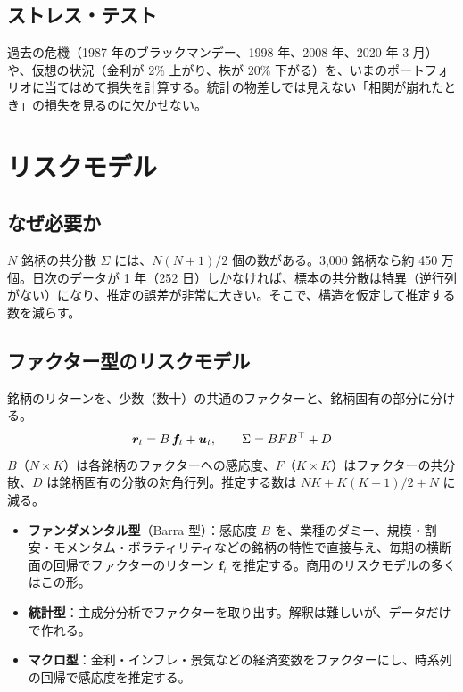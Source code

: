 \subsection{ストレス・テスト}

過去の危機（1987 年のブラックマンデー、1998 年、2008 年、2020 年 3 月）や、仮想の状況（金利が 2\% 上がり、株が 20\% 下がる）を、いまのポートフォリオに当てはめて損失を計算する。統計の物差しでは見えない「相関が崩れたとき」の損失を見るのに欠かせない。

\section{リスクモデル}

\subsection{なぜ必要か}

$N$ 銘柄の共分散 $\Sigma$ には、$N(N+1)/2$ 個の数がある。3,000 銘柄なら約 450 万個。日次のデータが 1 年（252 日）しかなければ、標本の共分散は特異（逆行列がない）になり、推定の誤差が非常に大きい。そこで、構造を仮定して推定する数を減らす。

\subsection{ファクター型のリスクモデル}

銘柄のリターンを、少数（数十）の共通のファクターと、銘柄固有の部分に分ける。
\begin{equation}
\bm r_t = B\,\bm f_t + \bm u_t, \qquad \Sigma = B F B^{\top} + D
\end{equation}
$B$（$N \times K$）は各銘柄のファクターへの感応度、$F$（$K \times K$）はファクターの共分散、$D$ は銘柄固有の分散の対角行列。推定する数は $NK + K(K+1)/2 + N$ に減る。

\begin{itemize}
\item \textbf{ファンダメンタル型}（Barra 型）：感応度 $B$ を、業種のダミー、規模・割安・モメンタム・ボラティリティなどの銘柄の特性で直接与え、毎期の横断面の回帰でファクターのリターン $\bm f_t$ を推定する。商用のリスクモデルの多くはこの形。
\item \textbf{統計型}：主成分分析でファクターを取り出す。解釈は難しいが、データだけで作れる。
\item \textbf{マクロ型}：金利・インフレ・景気などの経済変数をファクターにし、時系列の回帰で感応度を推定する。
\end{itemize}

